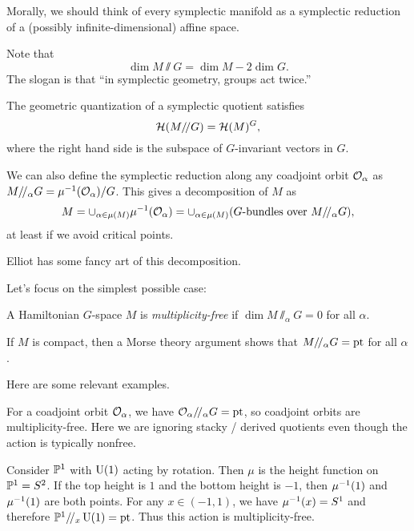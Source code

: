 \documentclass{article}
\begin{document}
Morally, we should think of every symplectic manifold as a symplectic reduction of a (possibly infinite-dimensional) affine space.

Note that
\[
\dim M \sslash G = \dim M - 2 \dim G.
\]
The slogan is that ``in symplectic geometry, groups act twice.''

\begin{thm}
	The geometric quantization of a symplectic quotient satisfies
	\[
		\mathcal{H}(M /\mkern-3mu/ G) = \mathcal{H}(M)^G,
	\]
	where the right hand side is the subspace of $G$-invariant vectors in $G$.
\end{thm}

We can also define the symplectic reduction along any coadjoint orbit $\mathcal{O}_\alpha$ as $M /\mkern-3mu/_\alpha G = \mu^{-1}(\mathcal{O}_\alpha) / G$.
This gives a decomposition of $M$ as 
\[
	M = \cup_{\alpha \in \mu(M)} \mu^{-1}(\mathcal{O}_\alpha) = \cup_{\alpha \in \mu(M)} (G\textrm{-bundles over } M /\mkern-3mu/_\alpha G),
\]
at least if we avoid critical points.

Elliot has some fancy art of this decomposition.

Let's focus on the simplest possible case:

\begin{dfn}
	A Hamiltonian $G$-space $M$ is \emph{multiplicity-free} if $\dim M \sslash_\alpha G = 0$ for all $\alpha$.
\end{dfn}

\begin{rmk}
	If $M$ is compact, then a Morse theory argument shows that $M /\mkern-3mu/_\alpha G = \operatorname{pt}$ for all $\alpha$.
\end{rmk}

Here are some relevant examples.

\begin{ex}
	For a coadjoint orbit $\mathcal{O}_\alpha$, we have $\mathcal{O}_\alpha /\mkern-3mu/_\alpha G = \operatorname{pt}$, so coadjoint orbits are multiplicity-free.
	Here we are ignoring stacky / derived quotients even though the action is typically nonfree.
\end{ex}

\begin{ex}
	Consider $\mathbb{P}^1$ with $\operatorname{U}(1)$ acting by rotation.
	Then $\mu$ is the height function on $\mathbb{P}^1 = S^2$.
	If the top height is $1$ and the bottom height is $-1$, then $\mu^{-1}(1)$ and $\mu^{-1}(1)$ are both points.
	For any $x \in (-1, 1)$, we have $\mu^{-1}(x) = S^1$ and therefore $\mathbb{P}^1 /\mkern-3mu/_x \operatorname{U}(1) = \operatorname{pt}$.
	Thus this action is multiplicity-free.
\end{ex}
\end{document}
